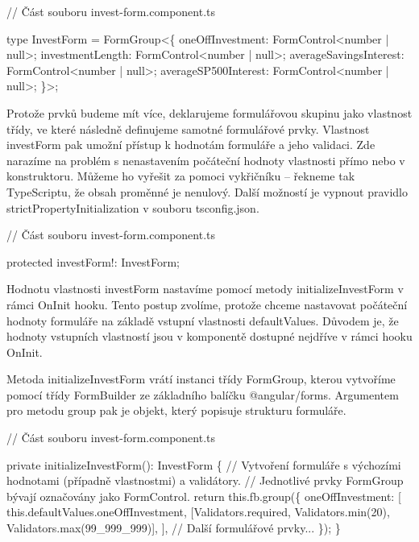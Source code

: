 \begin{prog}
// Část souboru invest-form.component.ts

type InvestForm = FormGroup<\{
  oneOffInvestment: FormControl<number | null>;
  investmentLength: FormControl<number | null>;
  averageSavingsInterest: FormControl<number | null>;
  averageSP500Interest: FormControl<number | null>;
\}>;
\end{prog}

Protože prvků budeme mít více, deklarujeme formulářovou skupinu jako vlastnost třídy, ve které následně definujeme samotné formulářové prvky. 
Vlastnost investForm pak umožní přístup k hodnotám formuláře a jeho validaci. Zde narazíme na problém s nenastavením počáteční hodnoty vlastnosti přímo nebo v konstruktoru. 
Můžeme ho vyřešit za pomoci vykřičníku -- řekneme tak TypeScriptu, že obsah proměnné je nenulový. Další možností je vypnout pravidlo strictPropertyInitialization v souboru tsconfig.json.

\begin{prog}
// Část souboru invest-form.component.ts

protected investForm!: InvestForm;
\end{prog}

Hodnotu vlastnosti investForm nastavíme pomocí metody initializeInvestForm v rámci OnInit hooku. 
Tento postup zvolíme, protože chceme nastavovat počáteční hodnoty formuláře na základě vstupní vlastnosti defaultValues.
Důvodem je, že hodnoty vstupních vlastností jsou v komponentě dostupné nejdříve v rámci hooku OnInit.

Metoda initializeInvestForm vrátí instanci třídy FormGroup, kterou vytvoříme pomocí třídy FormBuilder ze základního balíčku @angular/forms. 
Argumentem pro metodu group pak je objekt, který popisuje strukturu formuláře. 

\begin{prog}
// Část souboru invest-form.component.ts

private initializeInvestForm(): InvestForm \{
  // Vytvoření formuláře s výchozími hodnotami 
    (případně vlastnostmi) a validátory.
  // Jednotlivé prvky FormGroup bývají označovány jako FormControl.
  return this.fb.group(\{
    oneOffInvestment: [
      this.defaultValues.oneOffInvestment,
      [Validators.required, Validators.min(20), Validators.max(99_999_999)],
    ],
    // Další formulářové prvky... 
  \});
\}
\end{prog}

